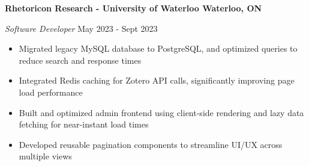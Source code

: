 \textbf{Rhetoricon Research - University of Waterloo \hfill Waterloo, ON}\par
\textit{Software Developer} \hfill May 2023 - Sept 2023

\begin{itemize}
  \item Migrated legacy MySQL database to PostgreSQL, and optimized queries to reduce search and response times
  \item Integrated Redis caching for Zotero API calls, significantly improving page load performance
  \item Built and optimized admin frontend using client-side rendering and lazy data fetching for near-instant load times
  \item Developed reusable pagination components to streamline UI/UX across multiple views
\end{itemize}
\vspace{0.2cm} \par
